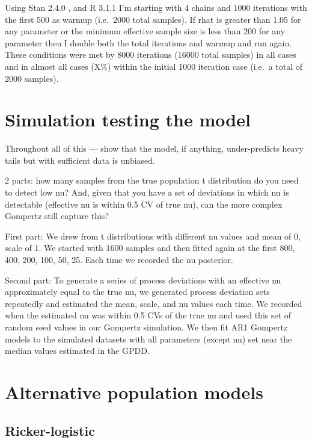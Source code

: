 \documentclass[11pt]{article}
\begin{document}
Using Stan 2.4.0 \citep{stan-manual2014}, and R 3.1.1 \citep{r2014} I'm starting with 4 chains and 1000 iterations with the first 500 as warmup (i.e.\ 2000 total samples). If rhat is greater than 1.05 for any parameter or the minimum effective sample size is less than 200 for any parameter then I double both the total iterations and warmup and run again. These conditions were met by 8000 iterations (16000 total samples) in all cases and in almost all cases (X\%) within the initial 1000 iteration case (i.e.\ a total of 2000 samples).


\section{Simulation testing the model}

Throughout all of this --- show that the model, if anything, under-predicts heavy tails but with sufficient data is unbiased.

2 parts: how many samples from the true population t distribution do you need to detect low nu? And, given that you have a set of deviations in which nu is detectable (effective nu is within 0.5 CV of true nu), can the more complex Gompertz still capture this?

First part: We drew from t distributions with different nu values and mean of 0, scale of 1. We started with 1600 samples and then fitted again at the first 800, 400, 200,  100, 50, 25. Each time we recorded the nu posterior.

Second part: To generate a series of process deviations with an effective nu approximately equal to the true nu, we generated process deviation sets repeatedly and estimated the mean, scale, and nu values each time. We recorded when the estimated nu was within 0.5 CVs of the true nu and used this set of random seed values in our Gompertz simulation. We then fit AR1 Gompertz models to the simulated datasets with all parameters (except nu) set near the median values estimated in the GPDD.

\section{Alternative population models}

\subsection{Ricker-logistic}
\end{document}
